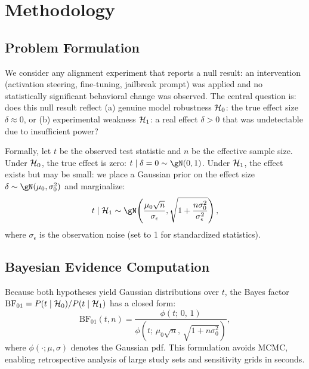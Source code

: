 \section{Methodology}
\label{sec:method}

\subsection{Problem Formulation}

We consider any alignment experiment that reports a null result: an intervention
(activation steering, \rlhf fine-tuning, jailbreak prompt) was applied and no
statistically significant behavioral change was observed. The central question is:
does this null result reflect (a) genuine model robustness $\mathcal{H}_0$: the true effect
size $\delta \approx 0$, or (b) experimental weakness $\mathcal{H}_1$: a real effect $\delta > 0$
that was undetectable due to insufficient power?

Formally, let $t$ be the observed test statistic and $n$ be the effective sample size.
Under $\mathcal{H}_0$, the true effect is zero: $t \mid \delta=0 \sim \gN(0, 1)$.
Under $\mathcal{H}_1$, the effect exists but may be small: we place a Gaussian prior on
the effect size $\delta \sim \gN(\mu_0, \sigma_0^2)$ and marginalize:
\begin{equation}
t \mid \Halt \sim \gN\!\left(\frac{\mu_0 \sqrt{n}}{\sigma_\epsilon},
    \sqrt{1 + \frac{n \sigma_0^2}{\sigma_\epsilon^2}}\right),
\label{eq:h1marginal}
\end{equation}
where $\sigma_\epsilon$ is the observation noise (set to 1 for standardized statistics).

\subsection{Bayesian Evidence Computation}

Because both hypotheses yield Gaussian distributions over $t$, the Bayes factor
$\mathrm{BF}_{01} = P(t \mid \mathcal{H}_0) / P(t \mid \mathcal{H}_1)$ has a closed form:
\begin{equation}
\mathrm{BF}_{01}(t, n) =
    \frac{\phi(t; \, 0, \, 1)}
         {\phi\!\left(t; \, \mu_0\sqrt{n}, \,
             \sqrt{1 + n\sigma_0^2}\right)},
\label{eq:bf01}
\end{equation}
where $\phi(\cdot; \mu, \sigma)$ denotes the Gaussian pdf. This formulation
avoids MCMC, enabling retrospective analysis of large study sets and sensitivity
grids in seconds.

